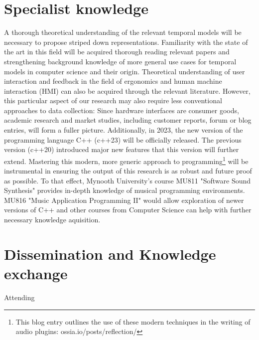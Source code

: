 \documentclass[journal,onecolumn]{IEEEtran}
\begin{document}
\section{Specialist knowledge} %
A thorough theoretical understanding of the relevant temporal models will be necessary to propose striped down representations. Familiarity with the state of the art in this field will be acquired thorough reading relevant papers and strengthening background knowledge of more general use cases for temporal models in computer science and their origin. Theoretical understanding of user interaction and feedback in the field of ergonomics and human machine interaction (HMI) can also be acquired through the relevant literature. However, this particular aspect of our research may also require less conventional approaches to data collection: Since hardware interfaces are consumer goods,  academic research and market studies, including customer reports, forum or blog entries, will form a fuller picture.
Additionally, in 2023, the new version of the programming language C++ (c++23) will be officially released. The previous version (c++20) introduced major new features that this version will further extend. Mastering this modern, more generic approach to programming\footnote{This blog entry outlines  the use of these modern techniques in the writing of audio plugins: ossia.io/posts/reflection/} will be instrumental in ensuring the output of this research is as robust and future proof as possible. To that effect, Mynooth University's course MU811 "Software Sound Synthesis" provides in-depth knowledge of musical programming environments. MU816 "Music Application Programming II" would allow exploration of newer versions of C++ and other courses from Computer Science can help with further necessary knowledge aquisition.

\section{Dissemination and Knowledge exchange} %
Attending 
\end{document}
